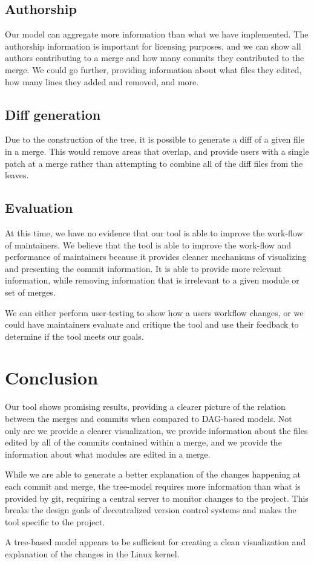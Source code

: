 \documentclass[conference, draftclsnofoot]{IEEEtran}
\begin{document}
\subsection{Authorship}

Our model can aggregate more information than what we have implemented. The
authorship information is important for licensing purposes, and we can show all
authors contributing to a merge and how many commits they contributed to the merge.
We could go further, providing information about what files they edited, how many
lines they added and removed, and more.

\subsection{Diff generation}

Due to the construction of the tree, it is possible to generate a diff of a given
file in a merge. This would remove areas that overlap, and provide users with a
single patch at a merge rather than attempting to combine all of the diff files from
the leaves.

\subsection{Evaluation}

At this time, we have no evidence that our tool is able to improve the work-flow of
maintainers. We believe that the tool is able to improve the work-flow and
performance of maintainers because it provides cleaner mechanisms of visualizing and
presenting the commit information. It is able to provide more relevant information,
while removing information that is irrelevant to a given module or set of merges.

We can either perform user-testing to show how a users workflow changes, or we could
have maintainers evaluate and critique the tool and use their feedback to determine
if the tool meets our goals.

\section{Conclusion}

Our tool shows promising results, providing a clearer picture of the relation
between the merges and commits when compared to DAG-based models. Not only are
we provide a clearer visualization, we provide information about the files
edited by all of the commits contained within a merge, and we provide the
information about what modules are edited in a merge.

While we are able to generate a better explanation of the changes happening at
each commit and merge, the tree-model requires more information than what is
provided by git, requiring a central server to monitor changes to the project.
This breaks the design goals of decentralized version control systems and makes
the tool specific to the project.

A tree-based model appears to be sufficient for creating a clean visualization
and explanation of the changes in the Linux kernel.

\nocite{*}


\end{document}
